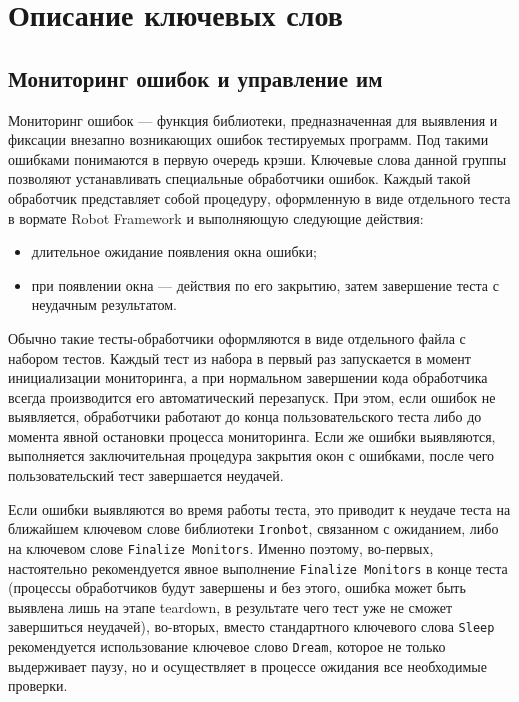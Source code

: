 \documentclass[11pt]{book} %
\begin{document}
\chapter{Описание ключевых слов}


\section{Мониторинг ошибок и управление им}

Мониторинг ошибок --- функция библиотеки, предназначенная для выявления и фиксации внезапно возникающих ошибок тестируемых программ. Под такими ошибками понимаются в первую очередь крэши. Ключевые слова данной группы позволяют устанавливать специальные обработчики ошибок. Каждый такой обработчик представляет собой процедуру, оформленную в виде отдельного теста в вормате Robot Framework и выполняющую следующие действия:

\begin{itemize}
\item длительное ожидание появления окна ошибки;
\item при появлении окна --- действия по его закрытию, затем завершение теста с неудачным результатом. 
\end{itemize}

Обычно такие тесты-обработчики оформляются в виде отдельного файла с набором тестов. Каждый тест из набора в первый раз запускается в момент инициализации мониторинга, а при нормальном завершении кода обработчика всегда производится его автоматический перезапуск. При этом, если ошибок не выявляется, обработчики работают до конца пользовательского теста либо до момента явной остановки процесса мониторинга. Если же ошибки выявляются, выполняется заключительная процедура закрытия окон с ошибками, после чего пользовательский тест завершается неудачей.

Если ошибки выявляются во время работы теста, это приводит к неудаче теста на ближайшем ключевом слове библиотеки \verb|Ironbot|, связанном с ожиданием, либо на ключевом слове \verb|Finalize Monitors|. Именно поэтому, во-первых, настоятельно рекомендуется явное выполнение \verb|Finalize Monitors| в конце теста (процессы обработчиков будут завершены и без этого, ошибка может быть выявлена лишь на этапе teardown, в результате чего тест уже не сможет завершиться неудачей), во-вторых, вместо стандартного ключевого слова \verb|Sleep| рекомендуется использование ключевое слово \verb|Dream|, которое не только выдерживает паузу, но и осуществляет в процессе ожидания все необходимые проверки. 
\end{document}
